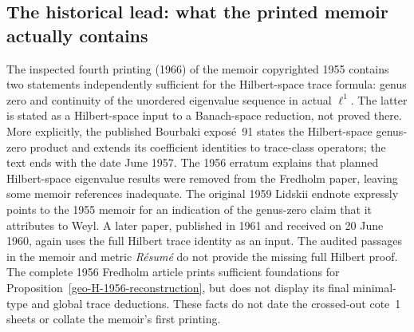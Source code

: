 \subsection{The historical lead: what the printed memoir actually contains}
\begin{proposition}
\label{geo-H-history}
The inspected fourth printing (1966) of the memoir copyrighted 1955
contains two statements independently sufficient for the Hilbert-space
trace formula: genus zero and continuity of the unordered eigenvalue
sequence in actual $\ell^1$. The latter is stated as a Hilbert-space input
to a Banach-space reduction, not proved there. More explicitly,
the published Bourbaki expos\'e~91 states the Hilbert-space genus-zero
product and extends its coefficient identities to trace-class operators;
the text ends with the date June 1957. The 1956
erratum explains that planned Hilbert-space eigenvalue results were removed
from the Fredholm paper, leaving some memoir references inadequate.
The original 1959 Lidskii endnote expressly points to the 1955 memoir
for an indication of the genus-zero claim that it attributes to Weyl.
A later paper, published in 1961 and received on 20 June 1960,
again uses the full Hilbert trace identity as an input.
The audited passages in the memoir and metric \emph{R\'esum\'e} do not
provide the missing full Hilbert proof. The complete 1956 Fredholm article
prints sufficient foundations for Proposition~\ref{geo-H-1956-reconstruction},
but does not display its final minimal-type and global trace deductions.
These facts do not date the crossed-out cote~1 sheets or collate the
memoir's first printing.
\end{proposition}
